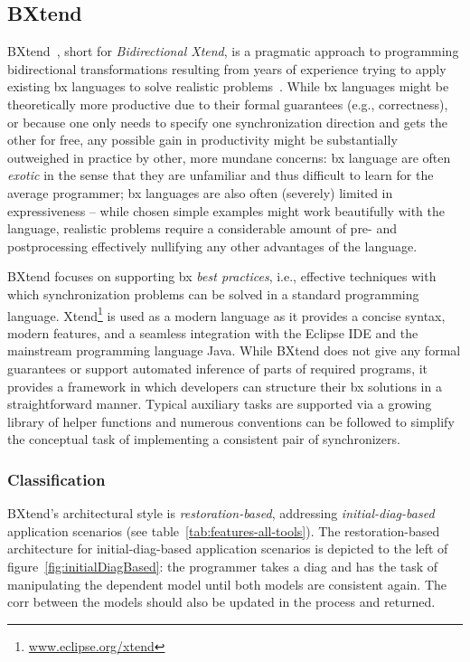 \subsection{BXtend}
\label{sec:BXtend}



BXtend~\cite{MODELSWARD2018-Buchmann}, short for \emph{Bidirectional Xtend}, is a pragmatic approach to programming bidirectional transformations resulting from years of experience trying to apply existing bx languages to solve realistic problems~\cite{DBLP:conf/icsoft/BuchmannG16}.
While bx languages might be theoretically more productive due to their formal guarantees (e.g., correctness), or because one only needs to specify one synchronization direction and gets the other for free, any possible gain in productivity might be substantially outweighed in practice by other, more mundane concerns: bx language are often \emph{exotic} in the sense that they are unfamiliar and thus difficult to learn for the average programmer; bx languages are also often (severely) limited in expressiveness -- while chosen simple examples might work beautifully with the language, realistic problems require a considerable amount of pre- and postprocessing effectively nullifying any other advantages of the language.

BXtend focuses on supporting bx \emph{best practices}, i.e., effective techniques with which synchronization problems can be solved in a standard programming language.
Xtend\footnote{\url{www.eclipse.org/xtend}} is used as a modern language as it provides a concise syntax, modern features, and a seamless integration with the Eclipse IDE and the mainstream programming language Java.
While BXtend does not give any formal guarantees or support automated inference of parts of required programs, it provides a framework in which developers can structure their bx solutions in a straightforward manner.
Typical auxiliary tasks are supported via a growing library of helper functions and numerous conventions can be followed to simplify the conceptual task of implementing a consistent pair of synchronizers.

\subsubsection{Classification}

BXtend's architectural style is \emph{restoration-based}, addressing \emph{initial-diag-based} application scenarios (see table~\ref{tab:features-all-tools}).
The restoration-based architecture for initial-diag-based application scenarios is depicted to the left of figure~\ref{fig:initialDiagBased}:  the programmer takes a diag and has the task of manipulating the dependent model until both models are consistent again.
The corr between the models should also be updated in the process and returned.

